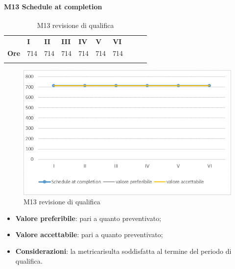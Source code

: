 \paragraph{M13 Schedule at completion} \mbox{}
\begin{longtable}[H!] {						
		>{}p{50mm}  		
		>{}p{8mm}
		>{}p{8mm}		
		>{}p{8mm}		
		>{}p{8mm}		
		>{}p{8mm}		
		>{}p{8mm}
		>{}p{8mm}
		>{}p{8mm}
		>{}p{8mm}
	}
	\rowcolor{gray!50}
	\textbf{} & \textbf{I} & \textbf{II} & \textbf{III} & \textbf{IV} & \textbf{V} & \textbf{VI} \TBstrut \\ [2mm]
	\textbf{Ore} & 714 & 714 & 714 & 714 & 714 & 714 \TBstrut \\ [2mm]
	\rowcolor{white}
	\caption{M13 revisione di qualifica}
\end{longtable}
\begin{figure}[H] 	
	\includegraphics[width=\linewidth]{./img/grafici/RQ13.png}	
	\caption{M13 revisione di qualifica}	
\end{figure}
\begin{itemize}
	\item \textbf{Valore preferibile}: pari a quanto preventivato;
	\item \textbf{Valore accettabile}: pari a quanto preventivato;
	\item \textbf{Considerazioni}: la metrica\glosp risulta soddisfatta al termine del periodo di qualifica.
\end{itemize}

